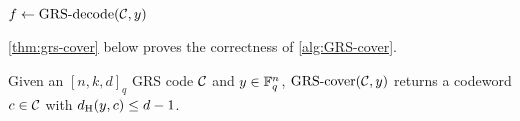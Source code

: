 \documentclass[conference]{IEEEtran}
\begin{document}
\begin{algorithm}[!htbp]
    \caption{$\GRScover(\CC, y)$} 
    \label{alg:GRS-cover}
    \begin{algorithmic}[1]
            \State $f \gets \operatorname{GRS-decode}({\mathcal C}, y)$
            \label{line:rsdecode}
            \Else 
                \label{line:punc}
                \label{line:y}
            \EndIf
        \EndFor
    \end{algorithmic}
\end{algorithm}

\autoref{thm:grs-cover} below proves the correctness of \autoref{alg:GRS-cover}. 

\begin{theorem}
    \label{thm:grs-cover}
    Given an $[n, k, d]_{q}$ GRS code ${\mathcal C}$ and $y \in {\mathbb F}_{q}^{n}$, $\GRScover(\CC, y)$ returns a codeword $c \in {\mathcal C}$ with $d_{{\rm H}}(y, c) \le d - 1$. 
\end{theorem}
\end{document}
